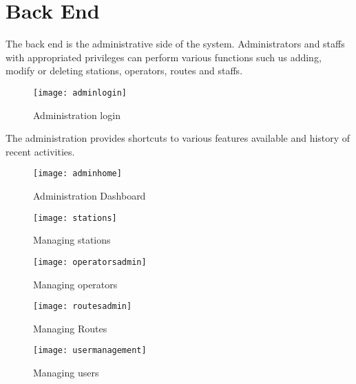 \section{Back End}
The back end is the administrative side of the system. Administrators and staffs with appropriated privileges can perform various functions such us adding, modify or deleting stations, operators, routes and staffs.
\begin{figure}[H]
	\centering
	\texttt{[image: adminlogin]}
	\caption[Administration login]{Administration login}
	\label{fig:adminlogin}
\end{figure}
The administration provides shortcuts to various features available and history of recent activities.
\begin{figure}[H]
	\centering
	\texttt{[image: adminhome]}
	\caption[Administration dasboard]{Administration Dashboard}
	\label{fig:adminhome}
\end{figure}
\begin{figure}[H]
	\centering
	\texttt{[image: stations]}
	\caption[Managinf stations]{Managing stations}
	\label{fig:stations}
\end{figure}
\begin{figure}[H]
	\centering
	\texttt{[image: operatorsadmin]}
	\caption[Managing operators]{Managing operators}
	\label{fig:operatorsadmin}
\end{figure}
\begin{figure}[H]
	\centering
	\texttt{[image: routesadmin]}
	\caption[Managing Routes]{Managing Routes}
	\label{fig:routesadmin}
\end{figure}
\begin{figure}[H]
	\centering
	\texttt{[image: usermanagement]}
	\caption[Managing users]{Managing users}
	\label{fig:usermanagement}
\end{figure}






